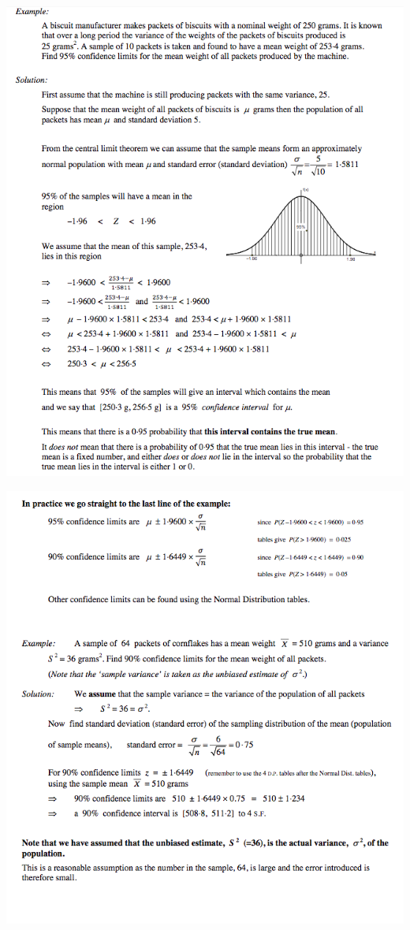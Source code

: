 \documentclass[a4paper]{article}
\begin{document}
\begin{eg}
\end{eg}
\begin{center}
	\includegraphics[scale=0.5]{img_S/18_eg1_1}
\end{center}
\begin{center}
	\includegraphics[scale=0.5]{img_S/18_eg1_2}
\end{center}
\end{document}
